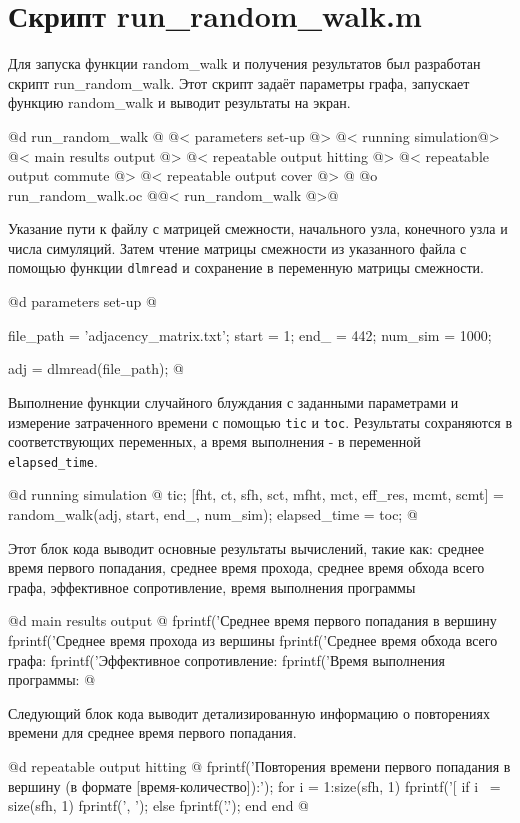 \documentclass[utf8x]{G7-32} %
\begin{document}
\section{Скрипт run_random_walk.m}
Для запуска функции random_walk и получения результатов был разработан скрипт run_random_walk. Этот скрипт задаёт параметры графа, запускает функцию random_walk и выводит результаты на экран.

@d run_random_walk @{
@< parameters set-up @>
@< running simulation@>
@< main results output @>
@< repeatable output hitting @>
@< repeatable output commute @>
@< repeatable output cover @>
@}
@o run_random_walk.oc @{@< run_random_walk  @>@}

Указание пути к файлу с матрицей смежности, начального узла, конечного узла и числа симуляций. Затем чтение матрицы смежности из указанного файла с помощью функции \texttt{dlmread} и сохранение в переменную матрицы смежности.

@d parameters set-up @{
file_path = 'adjacency_matrix.txt';
start = 1;
end_ = 442;
num_sim = 1000;

adj = dlmread(file_path);
@}

Выполнение функции случайного блуждания с заданными параметрами и измерение затраченного времени с помощью \texttt{tic} и \texttt{toc}. Результаты сохраняются в соответствующих переменных, а время выполнения - в переменной \texttt{elapsed_time}.

@d running simulation @{
tic;
[fht, ct, sfh, sct, mfht, mct, eff_res, mcmt, scmt] = random_walk(adj, start, end_, num_sim);
elapsed_time = toc;
@}


Этот блок кода выводит основные результаты вычислений, такие как: среднее время первого попадания, среднее время прохода, среднее время обхода всего графа, эффективное сопротивление, время выполнения программы

@d main results output  @{
fprintf('Среднее время первого попадания в вершину %
fprintf('Среднее время прохода из вершины %
fprintf('Среднее время обхода всего графа: %
fprintf('Эффективное сопротивление: %
fprintf('Время выполнения программы: %
@}


Следующий блок кода выводит детализированную информацию о повторениях времени для среднее время первого попадания.

@d repeatable output hitting @{
fprintf('Повторения времени первого попадания в вершину (в формате [время-количество]):\n');
    for i = 1:size(sfh, 1)
       fprintf('[%
       if i ~= size(sfh, 1)
           fprintf(', ');
       else
           fprintf('.\n');
       end
end
@}
\end{document}
